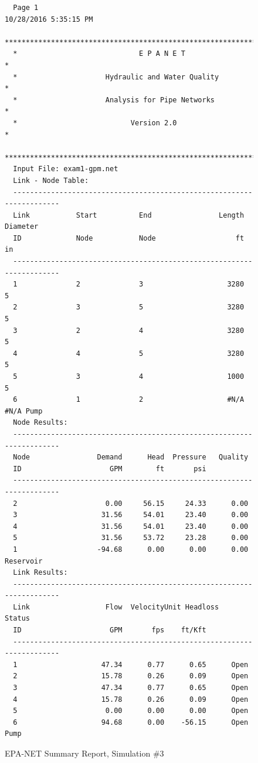 \documentclass[11pt]{article}
\begin{document}
\begin{enumerate}
\begin{figure}[ht!] %
\centering

\begin{verbatim}
  Page 1                                           10/28/2016 5:35:15 PM
  **********************************************************************
  *                             E P A N E T                            *
  *                     Hydraulic and Water Quality                    *
  *                     Analysis for Pipe Networks                     *
  *                           Version 2.0                              *
  **********************************************************************  
  Input File: exam1-gpm.net
  Link - Node Table:
  ----------------------------------------------------------------------
  Link           Start          End                Length  Diameter
  ID             Node           Node                   ft        in
  ----------------------------------------------------------------------
  1              2              3                    3280         5
  2              3              5                    3280         5
  3              2              4                    3280         5
  4              4              5                    3280         5
  5              3              4                    1000         5
  6              1              2                    #N/A      #N/A Pump
  Node Results:
  ----------------------------------------------------------------------
  Node                Demand      Head  Pressure   Quality
  ID                     GPM        ft       psi          
  ----------------------------------------------------------------------
  2                     0.00     56.15     24.33      0.00
  3                    31.56     54.01     23.40      0.00
  4                    31.56     54.01     23.40      0.00
  5                    31.56     53.72     23.28      0.00
  1                   -94.68      0.00      0.00      0.00 Reservoir                                                         
  Link Results:
  ----------------------------------------------------------------------
  Link                  Flow  VelocityUnit Headloss    Status
  ID                     GPM       fps    ft/Kft
  ----------------------------------------------------------------------
  1                    47.34      0.77      0.65      Open
  2                    15.78      0.26      0.09      Open
  3                    47.34      0.77      0.65      Open
  4                    15.78      0.26      0.09      Open
  5                     0.00      0.00      0.00      Open
  6                    94.68      0.00    -56.15      Open Pump
  \end{verbatim}
     \caption{EPA-NET Summary Report, Simulation \#3}
   \label{fig:epanet3} 
\end{figure}


\end{enumerate}
\end{document}
